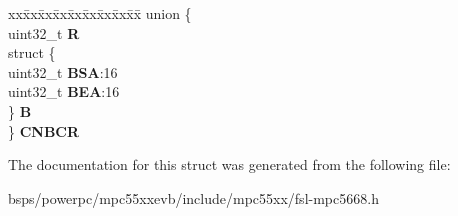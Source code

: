 \begin{DoxyCompactItemize}
\begin{tabbing}
\end{tabbing}\item 
\mbox{\label{structMLB__tag_1_1mlbch__t_af9a9a4361cc8b79883f8ac8cd197e101}} 
\begin{tabbing}
xx\=xx\=xx\=xx\=xx\=xx\=xx\=xx\=xx\=\kill
union \{\\
\>uint32\_t {\bfseries R}\\
\>struct \{\\
\>\>uint32\_t {\bfseries BSA}:16\\
\>\>uint32\_t {\bfseries BEA}:16\\
\>\} {\bfseries B}\\
\} {\bfseries CNBCR}\\

\end{tabbing}\end{DoxyCompactItemize}


The documentation for this struct was generated from the following file\+:\begin{DoxyCompactItemize}
\item 
bsps/powerpc/mpc55xxevb/include/mpc55xx/fsl-\/mpc5668.\+h\end{DoxyCompactItemize}
